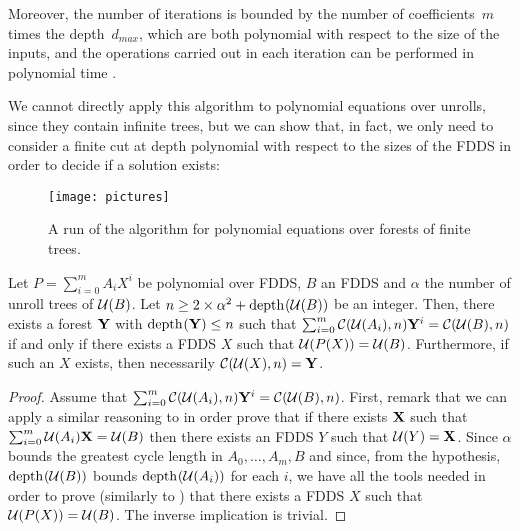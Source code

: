 		Moreover, the number of iterations is bounded by the number of coefficients~$m$ times the depth~$d_{max}$, which are both polynomial with respect to the size of the inputs, and the operations carried out in each iteration can be performed in polynomial time \cite{article_arbre,kroot}.
	
	        We cannot directly apply this algorithm to polynomial equations over unrolls, since they contain infinite trees, but we can show that, in fact, we only need to consider a finite cut at depth polynomial with respect to the sizes of the FDDS in order to decide if a solution exists:
	

        \begin{figure}[p]
        \centering
        \texttt{[image: pictures]}
        \caption{A run of the algorithm for polynomial equations over forests of finite trees.}
        \label{fig:algo}
        \end{figure}


	\begin{proposition}\label{prop:polyUnroll2PolyForestFini}
		Let $P = \sum_{i=0}^{m} A_i X^i$ be polynomial over FDDS, $B$ an FDDS and $\alpha$ the number of unroll trees of $\mathcal{U}(B)$.
		Let $n \ge 2 \times \alpha^2 + \mathrm{depth}_{}(\mathcal{U}(B))$ be an integer.
		Then, there exists a forest $\forest{y}$ with $\depth{\forest{y}} \le n$ such that $\sum_{i=0}^{m}\cut{\unroll{A_i}}{n}  \forest{y}^i = \cut{\unroll{B}}{n}$ if and only if there exists a FDDS $X$ such that $\mathcal{U}(P(X)) = \mathcal{U}(B)$. Furthermore, if such an $X$ exists, then necessarily $\cut{\unroll{X}}{n} = \forest{y}$.
	\end{proposition} 
	
	\begin{proof}
		Assume that $\sum_{i=0}^{m}\cut{\unroll{A_i}}{n} \forest{y}^i = \cut{\unroll{B}}{n}$.
		First, remark that we can apply a similar reasoning to \cite[Lemma 11]{kroot} in order prove that if there exists $\forest{x}$ such that $\sum_{i=0}^{m} \unroll{A_i} \forest{X} = \unroll{B}$ then there exists an FDDS $Y$ such that $\unroll{Y} = \forest{X}$. 
		Since $\alpha$ bounds the greatest cycle length in $A_0,\ldots,A_m,B$ and since, from the hypothesis, $\mathrm{depth}_{}(\mathcal{U}(B))$ bounds $\mathrm{depth}_{}(\mathcal{U}(A_i))$ for each $i$, we have all the tools needed in order to prove (similarly to \cite[Theorem 5]{kroot}) that there exists a FDDS $X$ such that $\mathcal{U}(P(X)) = \mathcal{U}(B)$. The inverse implication is trivial.
        \end{proof}
                
